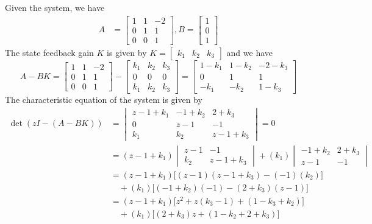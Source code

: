 Given the system, we have
\begin{align*}
    A
     & =
    \begin{bmatrix}
        1 & 1 & -2 \\
        0 & 1 & 1  \\
        0 & 0 & 1
    \end{bmatrix}
    ,
    B
    =
    \begin{bmatrix}
        1 \\
        0 \\
        1
    \end{bmatrix}
\end{align*}
The state feedback gain \( K \) is given by
\(
K =
\begin{bmatrix}
    k_1 & k_2 & k_3
\end{bmatrix}
\)
and we have
\begin{equation*}
    A - BK
    =
    \begin{bmatrix}
        1 & 1 & -2 \\
        0 & 1 & 1  \\
        0 & 0 & 1
    \end{bmatrix}
    -
    \begin{bmatrix}
        k_1 & k_2 & k_3 \\
        0   & 0   & 0   \\
        k_1 & k_2 & k_3
    \end{bmatrix}
    =
    \begin{bmatrix}
        1-k_1 & 1-k_2 & -2-k_3 \\
        0     & 1     & 1      \\
        -k_1  & -k_2  & 1-k_3
    \end{bmatrix}
\end{equation*}
The characteristic equation of the system is given by
\begin{align*}
    \det(zI - (A - BK))
     & =
    \begin{vmatrix}
        z - 1 + k_1 & -1 + k_2 & 2 + k_3     \\
        0           & z - 1    & -1          \\
        k_1         & k_2      & z - 1 + k_3
    \end{vmatrix}
    =
    0
    \\ & =
    (z - 1 + k_1)
    \begin{vmatrix}
        z - 1 & -1          \\
        k_2   & z - 1 + k_3
    \end{vmatrix}
    +
    (k_1)
    \begin{vmatrix}
        -1 + k_2 & 2 + k_3 \\
        z - 1    & -1
    \end{vmatrix}
    \\ & =
    (z - 1 + k_1)
    \Big[
        (z - 1)(z - 1 + k_3) - (-1)(k_2)
        \Big]
    \\ & \quad +
    (k_1)
    \Big[
        (-1 + k_2)(-1) - (2 + k_3)(z - 1)
        \Big]
    \\ & =
    (z - 1 + k_1)
    \Big[ z^2 + z(k_3 - 1) + (1 - k_3 + k_2) \Big]
    \\ & \quad +
    (k_1)
    \Big[ (2 + k_3)z + (1 - k_2 + 2 + k_3) \Big]
\end{align*}
